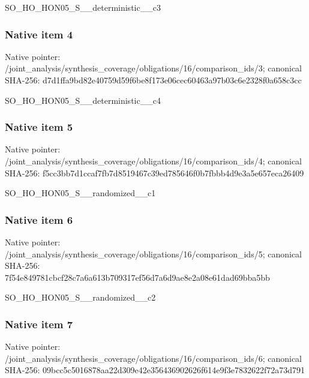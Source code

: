 \documentclass[10pt,a4paper]{article}
\begin{document}
\begingroup\raggedright\sloppy SO\_\allowbreak{}HO\_\allowbreak{}HON05\_\allowbreak{}S\_\allowbreak{}\_\allowbreak{}deterministic\_\allowbreak{}\_\allowbreak{}c3\par\endgroup

\subsubsection{Native item 4}
Native pointer: /joint\_\allowbreak{}analysis/synthesis\_\allowbreak{}coverage/obligations/16/comparison\_\allowbreak{}ids/3; canonical SHA-256: d7d1ffa9bd82e40759d59f6be8f173e06cec60463a97b03c6e2328f0a658c3cc

\begingroup\raggedright\sloppy SO\_\allowbreak{}HO\_\allowbreak{}HON05\_\allowbreak{}S\_\allowbreak{}\_\allowbreak{}deterministic\_\allowbreak{}\_\allowbreak{}c4\par\endgroup

\subsubsection{Native item 5}
Native pointer: /joint\_\allowbreak{}analysis/synthesis\_\allowbreak{}coverage/obligations/16/comparison\_\allowbreak{}ids/4; canonical SHA-256: f5cc3bb7d1ccaf7fb7d8519467c39ed785646f0b7fbbb4d9e3a5e657eca26409

\begingroup\raggedright\sloppy SO\_\allowbreak{}HO\_\allowbreak{}HON05\_\allowbreak{}S\_\allowbreak{}\_\allowbreak{}randomized\_\allowbreak{}\_\allowbreak{}c1\par\endgroup

\subsubsection{Native item 6}
Native pointer: /joint\_\allowbreak{}analysis/synthesis\_\allowbreak{}coverage/obligations/16/comparison\_\allowbreak{}ids/5; canonical SHA-256: 7f54e849781cbcf28c7a6a613b709317ef56d7a6d9ae8e2a08e61dad69bba5bb

\begingroup\raggedright\sloppy SO\_\allowbreak{}HO\_\allowbreak{}HON05\_\allowbreak{}S\_\allowbreak{}\_\allowbreak{}randomized\_\allowbreak{}\_\allowbreak{}c2\par\endgroup

\subsubsection{Native item 7}
Native pointer: /joint\_\allowbreak{}analysis/synthesis\_\allowbreak{}coverage/obligations/16/comparison\_\allowbreak{}ids/6; canonical SHA-256: 09bcc5c5016878aa22d309e42e356436902626f614e9f3e7832622f72a73d791
\end{document}
